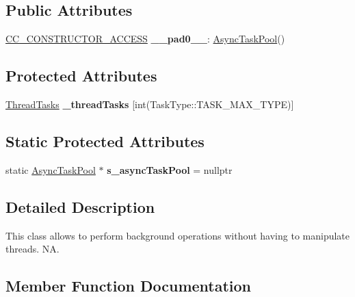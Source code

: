 \subsection*{Public Attributes}
\begin{DoxyCompactItemize}
\item 
\mbox{\label{classAsyncTaskPool_a6709bebcfca74cba9f542f062b5d7871}} 
\hyperlink{_2cocos2d_2cocos_2base_2ccConfig_8h_a25ef1314f97c35a2ed3d029b0ead6da0}{C\+C\+\_\+\+C\+O\+N\+S\+T\+R\+U\+C\+T\+O\+R\+\_\+\+A\+C\+C\+E\+SS} {\bfseries \+\_\+\+\_\+pad0\+\_\+\+\_\+}\+: \hyperlink{classAsyncTaskPool}{Async\+Task\+Pool}()
\end{DoxyCompactItemize}
\subsection*{Protected Attributes}
\begin{DoxyCompactItemize}
\item 
\mbox{\label{classAsyncTaskPool_a8ec31ea8a55c0d52c2ee1836400a332a}} 
\hyperlink{classAsyncTaskPool_1_1ThreadTasks}{Thread\+Tasks} {\bfseries \+\_\+thread\+Tasks} \mbox{[}int(Task\+Type\+::\+T\+A\+S\+K\+\_\+\+M\+A\+X\+\_\+\+T\+Y\+PE)\mbox{]}
\end{DoxyCompactItemize}
\subsection*{Static Protected Attributes}
\begin{DoxyCompactItemize}
\item 
\mbox{\label{classAsyncTaskPool_a5ed9d266e2a48eb2e53ffbb487644e9a}} 
static \hyperlink{classAsyncTaskPool}{Async\+Task\+Pool} $\ast$ {\bfseries s\+\_\+async\+Task\+Pool} = nullptr
\end{DoxyCompactItemize}


\subsection{Detailed Description}
This class allows to perform background operations without having to manipulate threads.  NA. 

\subsection{Member Function Documentation}
\mbox{\label{classAsyncTaskPool_a9e0a8926935d80cf5ce73ac7d748a4ae}} 
